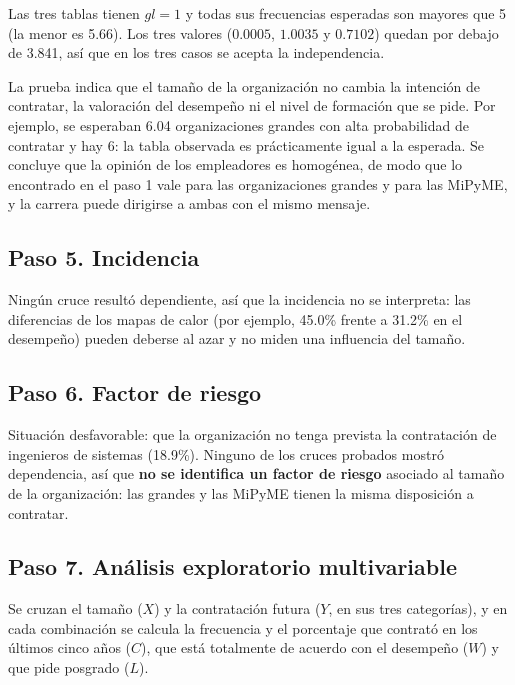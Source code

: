 \documentclass[12pt, a4paper]{article}
\begin{document}
Las tres tablas tienen $gl = 1$ y todas sus frecuencias esperadas son
mayores que 5 (la menor es 5.66). Los tres valores ($0.0005$, $1.0035$ y
$0.7102$) quedan por debajo de 3.841, así que en los tres casos se acepta
la independencia.

La prueba indica que el tamaño de la organización no cambia la intención
de contratar, la valoración del desempeño ni el nivel de formación que se
pide. Por ejemplo, se esperaban 6.04 organizaciones grandes con alta
probabilidad de contratar y hay 6: la tabla observada es prácticamente
igual a la esperada. Se concluye que la opinión de los empleadores es
homogénea, de modo que lo encontrado en el paso 1 vale para las
organizaciones grandes y para las MiPyME, y la carrera puede dirigirse a
ambas con el mismo mensaje.

\subsection{Paso 5. Incidencia}

Ningún cruce resultó dependiente, así que la incidencia no se
interpreta: las diferencias de los mapas de calor (por ejemplo, 45.0\%
frente a 31.2\% en el desempeño) pueden deberse al azar y no miden una
influencia del tamaño.

\subsection{Paso 6. Factor de riesgo}

Situación desfavorable: que la organización no tenga prevista la
contratación de ingenieros de sistemas (18.9\%). Ninguno de los cruces
probados mostró dependencia, así que \textbf{no se identifica un factor de
riesgo} asociado al tamaño de la organización: las grandes y las MiPyME
tienen la misma disposición a contratar.

\subsection{Paso 7. Análisis exploratorio multivariable}

Se cruzan el tamaño ($X$) y la contratación futura ($Y$, en sus tres
categorías), y en cada combinación se calcula la frecuencia y el
porcentaje que contrató en los últimos cinco años ($C$), que está
totalmente de acuerdo con el desempeño ($W$) y que pide posgrado ($L$).
\end{document}
